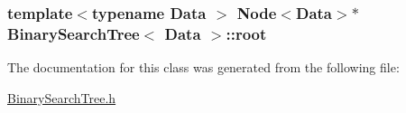\subsubsection[{\texorpdfstring{root}{root}}]{\setlength{\rightskip}{0pt plus 5cm}template$<$typename Data $>$ {\bf Node}$<${\bf Data}$>$$\ast$ {\bf Binary\+Search\+Tree}$<$ {\bf Data} $>$\+::root}\hypertarget{classBinarySearchTree_ad7242fa25135e33d45ce605c3692b9c0}{}\label{classBinarySearchTree_ad7242fa25135e33d45ce605c3692b9c0}


The documentation for this class was generated from the following file\+:\begin{DoxyCompactItemize}
\item 
\hyperlink{BinarySearchTree_8h}{Binary\+Search\+Tree.\+h}\end{DoxyCompactItemize}
